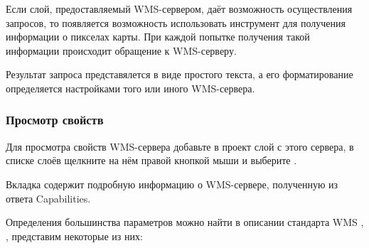 Если слой, предоставляемый WMS-сервером, даёт возможность осуществления
запросов, то появляется возможность использовать инструмент
 для получения информации о
пикселах карты. При каждой попытке получения такой информации происходит
обращение к WMS-серверу.

Результат запроса представялется в виде простого текста,
а его форматирование определяется настройками того или иного WMS-сервера.

\subsubsection{Просмотр
свойств}\label{sec:ogc-wms-properties}

Для просмотра свойств WMS-сервера добавьте в проект слой с этого сервера, в
списке слоёв щелкните на нём правой кнопкой мыши и выберите .

\label{sec:ogc-wms-properties-metadata}

Вкладка  содержит подробную информацию о
WMS-сервере, полученную из ответа Capabilities.

Определения большинства параметров можно найти в описании стандарта WMS
\cite{OGCWMS010101web}, \cite{OGCWMS010300web}, представим некоторые из них:

